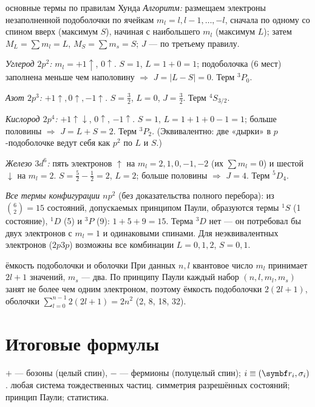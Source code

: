 \begin{derivation}[label=der:13:hund]{основные термы по правилам Хунда}
\emph{Алгоритм:} размещаем электроны незаполненной подоболочки по ячейкам $m_l=l,l-1,\dots,-l$, сначала по одному
со спином вверх (максимум $S$), начиная с наибольшего $m_l$ (максимум $L$); затем $M_L=\sum m_l=L$,
$M_S=\sum m_s=S$; $J$ — по третьему правилу.

\emph{Углерод $2p^2$:} $m_l=+1\uparrow$, $0\uparrow$. $S=1$, $L=1+0=1$; подоболочка ($6$ мест) заполнена меньше чем наполовину
$\Rightarrow$ $J=|L-S|=0$. Терм $^3P_0$.

\emph{Азот $2p^3$:} $+1\uparrow,0\uparrow,-1\uparrow$. $S=\frac32$, $L=0$, $J=\frac32$. Терм $^4S_{3/2}$.

\emph{Кислород $2p^4$:} $+1\uparrow\downarrow$, $0\uparrow$, $-1\uparrow$. $S=1$, $L=1+1+0-1=1$; больше половины $\Rightarrow$ $J=L+S=2$.
Терм $^3P_2$. (Эквивалентно: две «дырки» в $p$-подоболочке ведут себя как $p^2$ по $L$ и $S$.)

\emph{Железо $3d^6$:} пять электронов $\uparrow$ на $m_l=2,1,0,-1,-2$ (их $\sum m_l=0$) и шестой $\downarrow$ на $m_l=2$.
$S=\frac52-\frac12=2$, $L=2$; больше половины $\Rightarrow$ $J=4$. Терм $^5D_4$.

\emph{Все термы конфигурации $np^2$} (без доказательства полного перебора): из $\binom62=15$ состояний, допускаемых
принципом Паули, образуются термы $^1S$ (1 состояние), $^1D$ (5) и $^3P$ (9): $1+5+9=15$. Терма $^3D$ нет — он потребовал
бы двух электронов с $m_l=1$ и одинаковыми спинами. Для неэквивалентных электронов ($2p3p$) возможны все
комбинации $L=0,1,2$, $S=0,1$.
\end{derivation}

\begin{derivation}[label=der:13:capacity]{ёмкость подоболочки и оболочки}
При данных $n,l$ квантовое число $m_l$ принимает $2l+1$ значений, $m_s$ — два. По принципу Паули каждый набор
$(n,l,m_l,m_s)$ занят не более чем одним электроном, поэтому ёмкость подоболочки $2(2l+1)$, оболочки
$\sum_{l=0}^{n-1}2(2l+1)=2n^2$ (2, 8, 18, 32).
\end{derivation}

\section{Итоговые формулы}

 {$+$ — бозоны (целый спин), $-$ — фермионы (полуцелый спин); $i\equiv(\vect r_i,\sigma_i)$.}
 {любая система тождественных частиц.}
 {симметрия разрешённых состояний; принцип Паули; статистика.}

